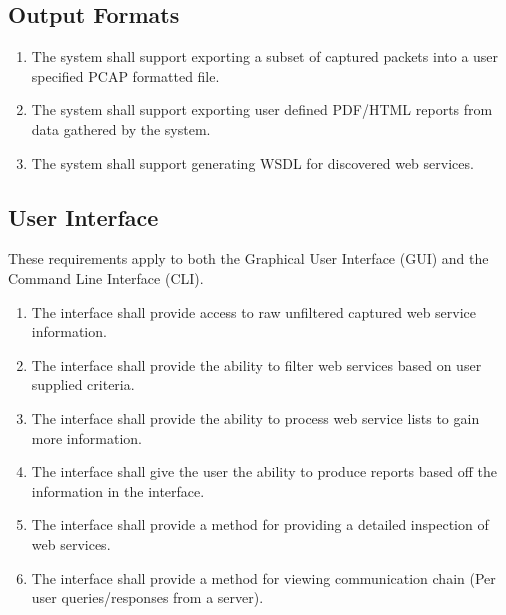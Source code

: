\documentclass[titlepage]{article}
\begin{document}

\subsection{Output Formats%
  \label{output-formats}%
}

\begin{enumerate}
    \item The system shall support exporting a subset of captured packets into
        a user specified PCAP formatted file.
    \item The system shall support exporting user defined PDF/HTML reports from
        data gathered by the system.
    \item The system shall support generating WSDL for discovered web services.
\end{enumerate}


\subsection{User Interface%
  \label{user-interface}%
}

These requirements apply to both the Graphical User Interface (GUI) and the
Command Line Interface (CLI).

\begin{enumerate}
    \item The interface shall provide access to raw unfiltered captured
        web service information.
    \item The interface shall provide the ability to filter web
        services based on user supplied criteria.
    \item The interface shall provide the ability to process web
        service lists to gain more information.
    \item The interface shall give the user the ability to produce
        reports based off the information in the interface.
    \item The interface shall provide a method for providing a
        detailed inspection of web services.
    \item The interface shall provide a method for viewing
        communication chain (Per user queries/responses from a server).
\end{enumerate}
\end{document}
